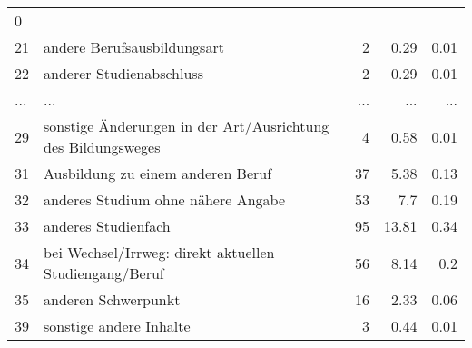 \begin{longtable}{lXrrr}
          \num[round-mode=places,round-precision=2]{0} \\
        21 & \multicolumn{1}{X}{andere Berufsausbildungsart} & %
          \num{2} &
          \num[round-mode=places,round-precision=2]{0.29} &
          \num[round-mode=places,round-precision=2]{0.01} \\
        22 & \multicolumn{1}{X}{anderer Studienabschluss} & %
          \num{2} &
          \num[round-mode=places,round-precision=2]{0.29} &
          \num[round-mode=places,round-precision=2]{0.01} \\
       ... & ... & ... & ... & ... \\
        29 & \multicolumn{1}{X}{sonstige Änderungen in der Art/Ausrichtung des Bildungsweges} & %
          \num{4} &
          \num[round-mode=places,round-precision=2]{0.58} &
          \num[round-mode=places,round-precision=2]{0.01} \\

        31 & \multicolumn{1}{X}{Ausbildung zu einem anderen Beruf} & %
          \num{37} &
          \num[round-mode=places,round-precision=2]{5.38} &
          \num[round-mode=places,round-precision=2]{0.13} \\

        32 & \multicolumn{1}{X}{anderes Studium ohne nähere Angabe} & %
          \num{53} &
          \num[round-mode=places,round-precision=2]{7.7} &
          \num[round-mode=places,round-precision=2]{0.19} \\

        33 & \multicolumn{1}{X}{anderes Studienfach} & %
          \num{95} &
          \num[round-mode=places,round-precision=2]{13.81} &
          \num[round-mode=places,round-precision=2]{0.34} \\

        34 & \multicolumn{1}{X}{bei Wechsel/Irrweg: direkt aktuellen Studiengang/Beruf} & %
          \num{56} &
          \num[round-mode=places,round-precision=2]{8.14} &
          \num[round-mode=places,round-precision=2]{0.2} \\

        35 & \multicolumn{1}{X}{anderen Schwerpunkt} & %
          \num{16} &
          \num[round-mode=places,round-precision=2]{2.33} &
          \num[round-mode=places,round-precision=2]{0.06} \\

        39 & \multicolumn{1}{X}{sonstige andere Inhalte} & %
          \num{3} &
          \num[round-mode=places,round-precision=2]{0.44} &
          \num[round-mode=places,round-precision=2]{0.01} \\


\end{longtable}
